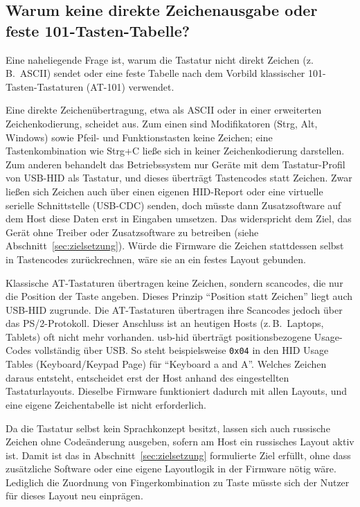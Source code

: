 \documentclass{article}
\begin{document}
\subsection{Warum keine direkte Zeichenausgabe oder feste 101-Tasten-Tabelle?}
\label{sec:chars}
Eine naheliegende Frage ist, warum die Tastatur nicht direkt Zeichen (z.\,B.\ ASCII) sendet oder eine feste Tabelle nach dem Vorbild klassischer 101-Tasten-Tastaturen (AT-101) verwendet.

Eine direkte Zeichenübertragung, etwa als ASCII oder in einer erweiterten Zeichenkodierung, scheidet aus. Zum einen sind Modifikatoren (Strg, Alt, Windows) sowie Pfeil- und Funktionstasten keine Zeichen; eine Tastenkombination wie Strg+C ließe sich in keiner Zeichenkodierung darstellen. Zum anderen behandelt das Betriebssystem nur Geräte mit dem Tastatur-Profil von USB-HID als Tastatur, und dieses überträgt Tastencodes statt Zeichen. Zwar ließen sich Zeichen auch über einen eigenen HID-Report oder eine virtuelle serielle Schnittstelle (USB-CDC) senden, doch müsste dann Zusatzsoftware auf dem Host diese Daten erst in Eingaben umsetzen. Das widerspricht dem Ziel, das Gerät ohne Treiber oder Zusatzsoftware zu betreiben (siehe Abschnitt~\ref{sec:zielsetzung}). Würde die Firmware die Zeichen stattdessen selbst in Tastencodes zurückrechnen, wäre sie an ein festes Layout gebunden.

Klassische AT-Tastaturen übertragen keine Zeichen, sondern \gls{scancode}s, die nur die Position der Taste angeben. Dieses Prinzip \enquote{Position statt Zeichen} liegt auch USB-HID zugrunde. Die AT-Tastaturen übertragen ihre Scancodes jedoch über das PS/2-Protokoll. Dieser Anschluss ist an heutigen Hosts (z.\,B.\ Laptops, Tablets) oft nicht mehr vorhanden. \gls{usb-hid} überträgt positionsbezogene Usage-Codes vollständig über USB. So steht beispielsweise \texttt{0x04} in den HID Usage Tables (Keyboard/Keypad Page) für \enquote{Keyboard a and A}. Welches Zeichen daraus entsteht, entscheidet erst der Host anhand des eingestellten Tastaturlayouts. Dieselbe Firmware funktioniert dadurch mit allen Layouts, und eine eigene Zeichentabelle ist nicht erforderlich.

Da die Tastatur selbst kein Sprachkonzept besitzt, lassen sich auch russische Zeichen ohne Codeänderung ausgeben, sofern am Host ein russisches Layout aktiv ist. Damit ist das in Abschnitt~\ref{sec:zielsetzung} formulierte Ziel erfüllt, ohne dass zusätzliche Software oder eine eigene Layoutlogik in der Firmware nötig wäre. Lediglich die Zuordnung von Fingerkombination zu Taste müsste sich der Nutzer für dieses Layout neu einprägen. 
\end{document}
